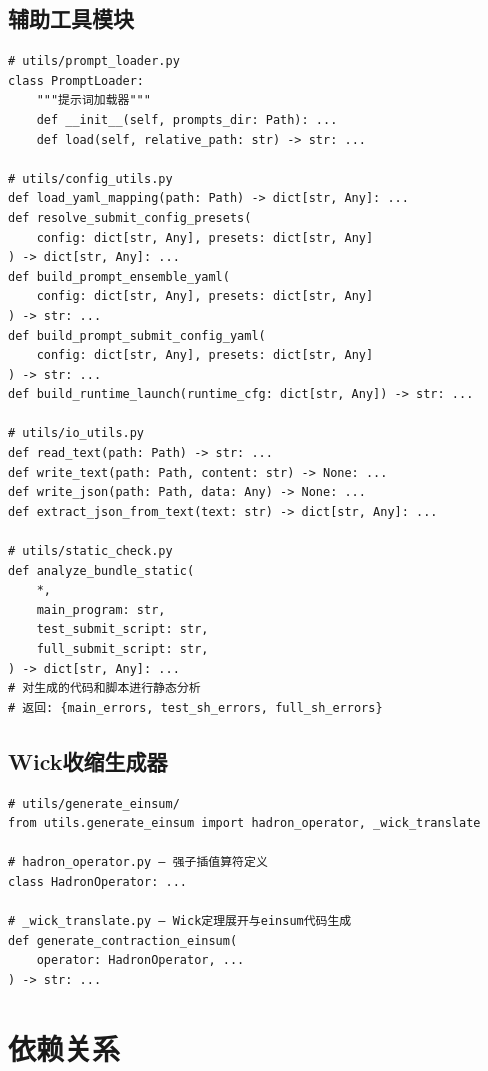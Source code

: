 \documentclass[12pt,a4paper]{ctexart}
\begin{document}
\subsection{辅助工具模块}

\begin{lstlisting}[caption={辅助工具函数}]
# utils/prompt_loader.py
class PromptLoader:
    """提示词加载器"""
    def __init__(self, prompts_dir: Path): ...
    def load(self, relative_path: str) -> str: ...

# utils/config_utils.py
def load_yaml_mapping(path: Path) -> dict[str, Any]: ...
def resolve_submit_config_presets(
    config: dict[str, Any], presets: dict[str, Any]
) -> dict[str, Any]: ...
def build_prompt_ensemble_yaml(
    config: dict[str, Any], presets: dict[str, Any]
) -> str: ...
def build_prompt_submit_config_yaml(
    config: dict[str, Any], presets: dict[str, Any]
) -> str: ...
def build_runtime_launch(runtime_cfg: dict[str, Any]) -> str: ...

# utils/io_utils.py
def read_text(path: Path) -> str: ...
def write_text(path: Path, content: str) -> None: ...
def write_json(path: Path, data: Any) -> None: ...
def extract_json_from_text(text: str) -> dict[str, Any]: ...

# utils/static_check.py
def analyze_bundle_static(
    *,
    main_program: str,
    test_submit_script: str,
    full_submit_script: str,
) -> dict[str, Any]: ...
# 对生成的代码和脚本进行静态分析
# 返回: {main_errors, test_sh_errors, full_sh_errors}
\end{lstlisting}

\subsection{Wick收缩生成器}

\begin{lstlisting}[caption={Wick收缩与einsum生成}]
# utils/generate_einsum/
from utils.generate_einsum import hadron_operator, _wick_translate

# hadron_operator.py — 强子插值算符定义
class HadronOperator: ...

# _wick_translate.py — Wick定理展开与einsum代码生成
def generate_contraction_einsum(
    operator: HadronOperator, ...
) -> str: ...
\end{lstlisting}

\section{依赖关系}
\end{document}

